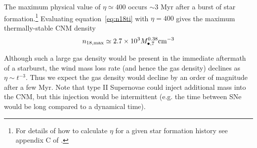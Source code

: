 \documentclass[usenatbib,fleqn]{mnras}
\newcommand{\Mbh}[1][]{M_{\bullet#1}}
\begin{document}
The maximum physical value of $\eta\simeq 400$ occurs $\sim 3$ Myr after a burst of star formation.\footnote{For details
  of how to calculate $\eta$ for a given star formation history see
  appendix C of \citet{Generozov+2015}.}  Evaluating equation~\eqref{eq:n18ti} with
$\eta=400$ gives the maximum thermally-stable CNM density
\begin{equation}
n_{\rm 18,max} \simeq 2.7\times 10^{3} \Mbh[,7]^{0.38} {\rm cm^{-3}}
\label{eq:n18max}
\end{equation}

Although such a large gas density would be present in the immediate aftermath of a starburst, the wind mass loss rate (and hence the gas density) declines as $\eta \sim t^{-3}$. Thus we expect the gas density would decline by an order of magnitude after a few Myr. Note that type II Supernovae could inject additional mass into the CNM, but this injection would be intermittent (e.g. the time between SNe would be long compared to a dynamical time).



\end{document}
